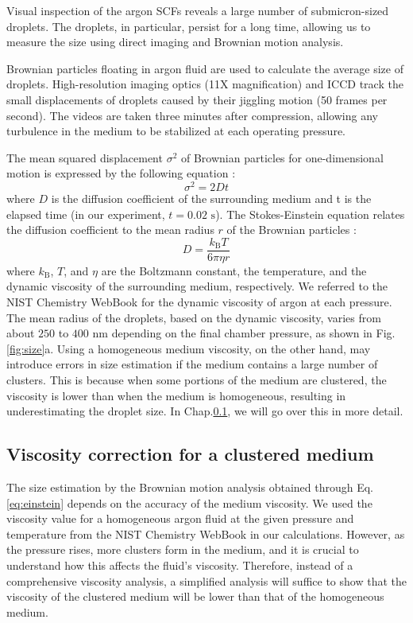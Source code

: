 Visual inspection of the argon SCFs reveals a large number of submicron-sized droplets. The droplets, in particular, persist for a long time, allowing us to measure the size using direct imaging and Brownian motion analysis.

Brownian particles floating in argon fluid are used to calculate the average size of droplets. High-resolution imaging optics (11X magnification) and ICCD track the small displacements of droplets caused by their jiggling motion (50 frames per second). The videos are taken three minutes after compression, allowing any turbulence in the medium to be stabilized at each operating pressure. 

The mean squared displacement $\sigma^2$ of Brownian particles for one-dimensional motion is expressed by the following equation \cite{einstein1956investigations}:
\begin{equation}
\sigma^2 = 2Dt
\end{equation}
where $D$ is the diffusion coefficient of the surrounding medium and t is the elapsed time (in our experiment, $t=0.02 \text{ s}$). The Stokes-Einstein equation relates the diffusion coefficient to the mean radius $r$ of the Brownian particles \cite{einstein1956investigations}:
\begin{equation}
D=\frac{k_\text{B} T}{6\pi \eta r}
\label{eq:einstein}
\end{equation}
where $k_\text{B}$, $T$, and $\eta$ are the Boltzmann constant, the temperature, and the dynamic viscosity of the surrounding medium, respectively. We referred to the NIST Chemistry WebBook \cite{linstorm2020nist} for the dynamic viscosity of argon at each pressure. The mean radius of the droplets, based on the dynamic viscosity, varies from about $250$ to $400 \text{ nm}$ depending on the final chamber pressure, as shown in Fig.\ref{fig:size}a. Using a homogeneous medium viscosity, on the other hand, may introduce errors in size estimation if the medium contains a large number of clusters. This is because when some portions of the medium are clustered, the viscosity is lower than when the medium is homogeneous, resulting in underestimating the droplet size. In Chap.\ref{sec:ch2-4-2}, we will go over this in more detail.

\subsection{Viscosity correction for a clustered medium}
\label{sec:ch2-4-2}

The size estimation by the Brownian motion analysis obtained through Eq.\ref{eq:einstein} depends on the accuracy of the medium viscosity. We used the viscosity value for a homogeneous argon fluid at the given pressure and temperature from the NIST Chemistry WebBook \cite{linstorm2020nist} in our calculations. However, as the pressure rises, more clusters form in the medium, and it is crucial to understand how this affects the fluid's viscosity. Therefore, instead of a comprehensive viscosity analysis, a simplified analysis will suffice to show that the viscosity of the clustered medium will be lower than that of the homogeneous medium.

